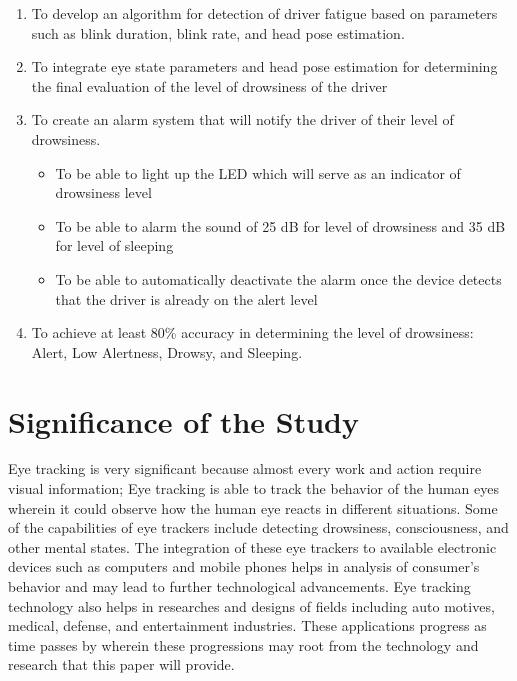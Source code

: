 \begin{enumerate}
	
	\item To develop an algorithm for detection of driver fatigue based on parameters such as blink duration, blink rate, and head pose estimation.
	
	\item To integrate eye state parameters and head pose estimation for determining the final evaluation of the level of drowsiness of the driver
	
	\item To create an alarm system that will notify the driver of their level of drowsiness.
	\begin{itemize}
	    \item To be able to light up the LED which will serve as an indicator of drowsiness level
	    \item To be able to alarm the sound of 25 dB for level of drowsiness and 35 dB for level of sleeping
	    \item To be able to automatically deactivate the alarm once the device detects that the driver is already on the alert level
    \end{itemize}
    \item To achieve at least 80\% accuracy in determining the level of drowsiness: Alert, Low Alertness, Drowsy, and Sleeping.
	
\end{enumerate}



\section{Significance of the Study}

Eye tracking is very significant because almost every work and action require visual information; Eye tracking is able to track the behavior of the human eyes wherein it could observe how the human eye reacts in different situations. Some of the capabilities of eye trackers include detecting drowsiness, consciousness, and other mental states. The integration of these eye trackers to available electronic devices such as computers and mobile phones helps in analysis of consumer’s behavior and may lead to further technological advancements. Eye tracking technology also helps in researches and designs of fields including auto motives, medical, defense, and entertainment industries. These applications progress as time passes by wherein these progressions may root from the technology and research that this paper will provide.

